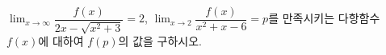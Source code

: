 $\displaystyle\lim_{x\to\infty}\dfrac{f(x)}{2x-\sqrt{x^2+3}}=2$, $\displaystyle\lim_{x\to 2}\dfrac{f(x)}{x^2+x-6}=p$를 만족시키는 다항함수 $f(x)$에 대하여 $f(p)$의 값을 구하시오. 

